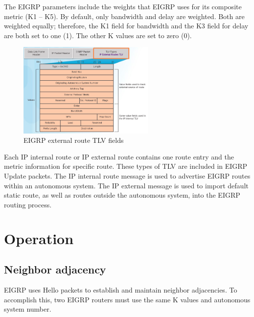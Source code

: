 The EIGRP parameters include the weights that EIGRP uses for its composite metric (K1 -- K5). By default, only bandwidth and delay are weighted. Both are weighted equally; therefore, the K1 field for bandwidth and the K3 field for delay are both set to one (1). The other K values are set to zero (0).\\

\begin{figure}[hbtp]
\centering
\includegraphics[width=0.6\textwidth]{pictures/EIGRP-external-route.png}
\caption{EIGRP external route TLV fields} \label{EIGRP-external-route}
\end{figure}
 
Each IP internal route or IP external route contains one route entry and the metric information for specific route. These types of TLV are included in EIGRP Update packets. The IP internal route message is used to advertise EIGRP routes within an autonomous system. The IP external message is used to import default static route, as well as routes outside the autonomous system, into the EIGRP routing process.
 
\section{Operation}

\subsection{Neighbor adjacency}
EIGRP uses Hello packets to establish and maintain neighbor adjacencies. To accomplish this, two EIGRP routers must use the same K values and autonomous system number.\\

